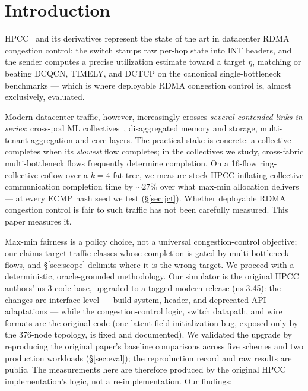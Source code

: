 \documentclass[conference]{IEEEtran}
\begin{document}
\section{Introduction}

HPCC~\cite{li2019hpcc} and its derivatives represent the state of the art in datacenter RDMA
congestion control: the switch stamps raw per-hop state into INT headers, and the sender
computes a precise utilization estimate toward a target $\eta$, matching or beating DCQCN,
TIMELY, and DCTCP on the canonical single-bottleneck benchmarks --- which is where deployable
RDMA congestion control is, almost exclusively, evaluated.

Modern datacenter traffic, however, increasingly crosses \emph{several contended links in
series}: cross-pod ML collectives~\cite{sergeev2018horovod}, disaggregated memory and
storage, multi-tenant aggregation and core layers. The practical stake is concrete: a collective completes when its
\emph{slowest} flow completes; in the collectives we study, cross-fabric multi-bottleneck
flows frequently determine completion. On a 16-flow ring-collective coflow over a $k{=}4$ fat-tree, we measure stock
HPCC inflating collective communication completion time by ${\sim}27\%$ over what max-min
allocation delivers ---
at every ECMP hash seed we test (\S\ref{sec:jct}). Whether deployable RDMA congestion control
is fair to such traffic has not been carefully measured. This paper measures it.

Max-min fairness is a policy choice, not a universal congestion-control objective; our claims
target traffic classes whose completion is gated by multi-bottleneck flows, and \S\ref{sec:scope}
delimits where it is the wrong target. We proceed with a deterministic, oracle-grounded
methodology. Our simulator is the original HPCC authors' ns-3 code base, upgraded to a
tagged modern release (ns-3.45): the changes are interface-level --- build-system, header, and
deprecated-API adaptations --- while the congestion-control logic, switch datapath, and wire
formats are the original code (one latent field-initialization bug, exposed only by the 376-node
topology, is fixed and documented). We validated the upgrade by reproducing the original paper's
baseline comparisons across five schemes and two production workloads (\S\ref{sec:eval}); the
reproduction record and raw results are public. The measurements here are therefore produced by
the original HPCC implementation's logic, not a re-implementation. Our findings:
\end{document}

